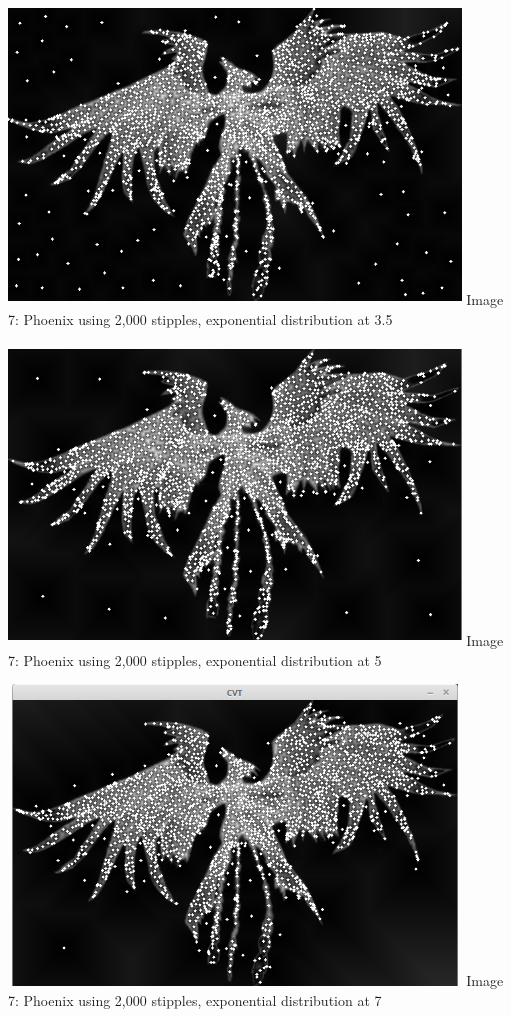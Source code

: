 \documentclass[11pt]{article}
\begin{document}
\includegraphics[width=12cm, height=8cm]{3point5Phoenix.png} 
\newline Image 7: Phoenix using 2,000 stipples, exponential distribution at 3.5

\includegraphics[width=12cm, height=8cm]{5Phoenix.png} 
\newline Image 7: Phoenix using 2,000 stipples, exponential distribution at 5 


\includegraphics[width=12cm, height=8cm]{7phoenix.png} 
\newline Image 7: Phoenix using 2,000 stipples, exponential distribution at 7 
\end{document}
